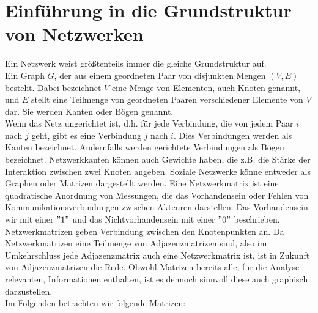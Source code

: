 \section{Einführung in die Grundstruktur von Netzwerken}
Ein Netzwerk weist größtenteils immer die gleiche Grundstruktur auf.\\
Ein Graph $G$, der aus einem
geordneten Paar von disjunkten Mengen $(V ,E)$ besteht. Dabei bezeichnet $V$ eine Menge von Elementen, auch Knoten genannt, und $E$ stellt eine Teilmenge von geordneten Paaren verschiedener Elemente von $V$ dar. Sie werden Kanten oder Bögen genannt.\\
Wenn das Netz ungerichtet ist, d.h. für jede Verbindung, die von jedem Paar $i$ nach $j$ geht, gibt es eine Verbindung $j$ nach $i$. Dies Verbindungen werden als Kanten bezeichnet. Andernfalls werden gerichtete Verbindungen
als Bögen bezeichnet. Netzwerkkanten können auch Gewichte haben, die z.B. die Stärke der Interaktion zwischen zwei Knoten angeben.
Soziale Netzwerke könne entweder als Graphen oder Matrizen dargestellt werden. Eine Netzwerkmatrix ist eine quadratische Anordnung von Messungen, die das Vorhandensein oder Fehlen von Kommunikationsverbindungen zwischen Akteuren darstellen. Das Vorhandensein wir mit einer $"1"$ und das Nichtvorhandensein mit einer $"0"$ beschrieben. Netzwerkmatrizen geben Verbindung zwischen den Knotenpunkten an. Da Netzwerkmatrizen eine Teilmenge von Adjazenzmatrizen sind, also im Umkehrschluss jede Adjazenzmatrix auch eine Netzwerkmatrix ist, ist in Zukunft von Adjazenzmatrizen die Rede. Obwohl Matrizen bereits alle, für die Analyse relevanten, Informationen enthalten, ist es dennoch sinnvoll diese auch graphisch darzustellen. \\
Im Folgenden betrachten wir folgende Matrizen: \\
 
